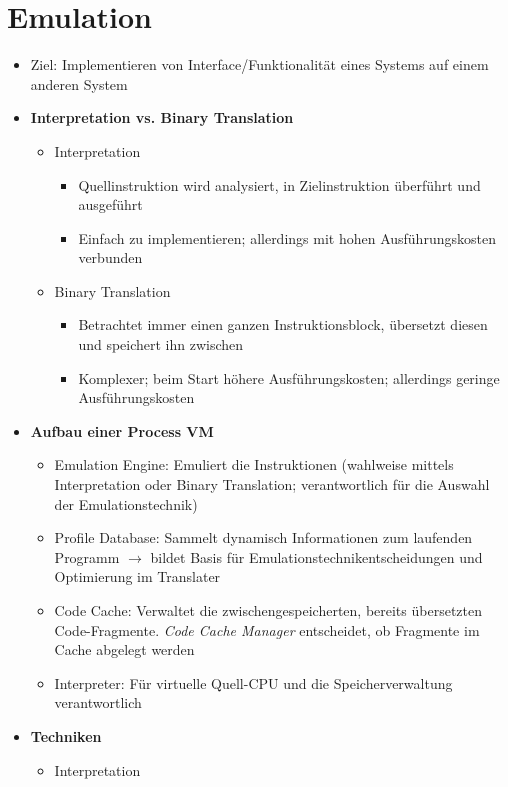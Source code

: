 \section{Emulation}
\begin{itemize}
	\item Ziel: Implementieren von Interface/Funktionalität eines Systems auf einem anderen System
	\item \textbf{Interpretation vs. Binary Translation}
	\begin{itemize}
		\item Interpretation
		\begin{itemize}
			\item Quellinstruktion wird analysiert, in Zielinstruktion überführt und ausgeführt
			\item Einfach zu implementieren; allerdings mit hohen Ausführungskosten verbunden
		\end{itemize}
		\item Binary Translation
		\begin{itemize}
			\item Betrachtet immer einen ganzen Instruktionsblock, übersetzt diesen und speichert ihn zwischen
			\item Komplexer; beim Start höhere Ausführungskosten; allerdings geringe Ausführungskosten
		\end{itemize}
	\end{itemize}
	\item \textbf{Aufbau einer Process VM}
	\begin{itemize}
		\item Emulation Engine: Emuliert die Instruktionen (wahlweise mittels Interpretation oder Binary Translation; verantwortlich für die Auswahl der Emulationstechnik)
		\item Profile Database: Sammelt dynamisch Informationen zum laufenden Programm \(\rightarrow\) bildet Basis für Emulationstechnikentscheidungen und Optimierung im Translater
		\item Code Cache: Verwaltet die zwischengespeicherten, bereits übersetzten Code-Fragmente. \textit{Code Cache Manager} entscheidet, ob Fragmente im Cache abgelegt werden
		\item Interpreter: Für virtuelle Quell-CPU und die Speicherverwaltung verantwortlich
	\end{itemize}
	\item \textbf{Techniken}
	\begin{itemize}
		\item Interpretation

\end{itemize}
\end{itemize}

